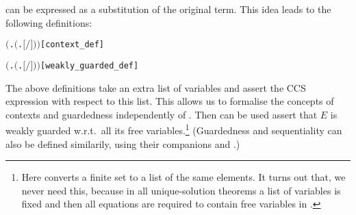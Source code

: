 can be expressed as a \univariate substitution of the original term.
This idea leads to the following definitions:
\begin{alltt}
      \HOLTokenDefEquality{}  \ensuremath{(}\HOLTokenLambda{}.  \ensuremath{(}\HOLTokenLambda{}. \ensuremath{[}\ensuremath{/}\ensuremath{]} \ensuremath{)}\ensuremath{)} \hfill{[context_def]}

      \HOLTokenDefEquality{}  \ensuremath{(}\HOLTokenLambda{}.  \ensuremath{(}\HOLTokenLambda{}. \ensuremath{[}\ensuremath{/}\ensuremath{]} \ensuremath{)}\ensuremath{)} \hfill{[weakly_guarded_def]}
\end{alltt}
The above definitions take an extra list of variables  and
assert the CCS expression  with respect to this list. This
allows us to formalise the concepts of contexts and guardedness
independently of . Then  can
be used assert that $E$ is weakly guarded w.r.t.~all its free
variables.\footnote{Here  converts a finite set
  to a list of the same elements. It turns out that, we never need this, because
  in all unique-solution theorems a list of variables  is fixed and
  then all equations are required to contain free variables in
  .}
(Guardedness and sequentiality can also be defined similarily, using
their \univariate companions  and .)

